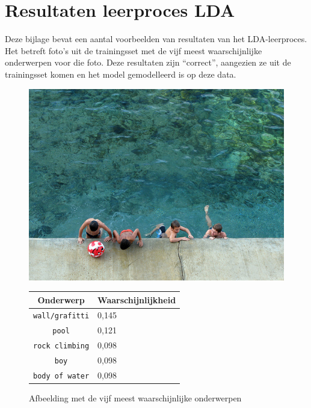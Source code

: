 \chapter{Resultaten leerproces LDA}
\label{app:LDA}
Deze bijlage bevat een aantal voorbeelden van resultaten van het LDA-leerproces. Het betreft foto's uit de trainingsset met de vijf meest waarschijnlijke onderwerpen voor die foto. Deze resultaten zijn ``correct'', aangezien ze uit de trainingsset komen en het model gemodelleerd is op deze data.

\begin{figure}[h]
	\centering
	\begin{minipage}[t]{.5\linewidth}
		\centering
		\vspace{0pt}
		\includegraphics[width=\textwidth]{Images/LDA/3283626303.jpg}
	\end{minipage}\hfill
	\begin{minipage}[t]{.5\textwidth}
		\centering
		\vspace{0pt}
		\begin{tabularx}{\textwidth}{cl}
			Onderwerp                           & Waarschijnlijkheid\\
			\hline
			\texttt{wall/grafitti} & 0,145\\
			\texttt{pool} & 0,121\\
			\texttt{rock climbing} & 0,098\\
			\texttt{boy} & 0,098\\
			\texttt{body of water} & 0,098\\
			\hline
		\end{tabularx}
	\end{minipage}
	\caption{Afbeelding met de vijf meest waarschijnlijke onderwerpen}
\end{figure}


